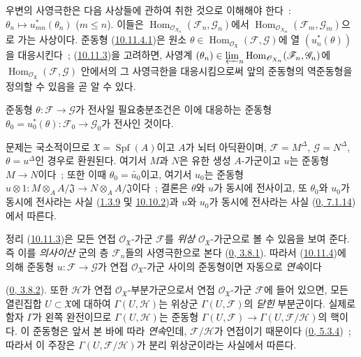우변의 사영극한은 다음 사상들에 관하여 취한 것으로 이해해야 한다~:
$\theta_n\mapsto u_{mn}^*(\theta_n)$ ($m\leq n$). 이들은
$\operatorname{Hom}_{\mathscr{O}_{X_n}}
(\mathscr{F}_n,\mathscr{G}_n)$에서
$\operatorname{Hom}_{\mathscr{O}_{X_m}}
(\mathscr{F}_m,\mathscr{G}_m)$으로 가는 사상이다. 준동형
(\hyperref[I.10.11.4.1-ko]{10.11.4.1})은 원소
$\theta\in\operatorname{Hom}_{\mathscr{O}_{\mathfrak{X}}}
(\mathscr{F},\mathscr{G})$에 열 $(u_n^*(\theta))$을 대응시킨다~;
(\hyperref[I.10.11.3-ko]{10.11.3})을 고려하면, 사영계
$(\theta_n)\in\varprojlim_n
\operatorname{Hom}_{\mathscr{O}_{X_n}}
(\mathscr{F}_n,\mathscr{G}_n)$에
$\operatorname{Hom}_{\mathscr{O}_{\mathfrak{X}}}
(\mathscr{F},\mathscr{G})$ 안에서의 그 사영극한을 대응시킴으로써
앞의 준동형의 역준동형을 정의할 수 있음을 곧 알 수 있다.

\begin{corollary}[10.11.5]
\label{I.10.11.5-ko}
준동형 $\theta:\mathscr{F}\to\mathscr{G}$가 전사일 필요충분조건은
이에 대응하는 준동형
$\theta_0=u_0^*(\theta):\mathscr{F}_0\to\mathscr{G}_0$가 전사인 것이다.
\end{corollary}

문제는 국소적이므로
$\mathfrak{X}=\operatorname{Spf}(A)$이고 $A$가 뇌터 아딕환이며,
$\mathscr{F}=M^\Delta$, $\mathscr{G}=N^\Delta$, $\theta=u^\Delta$인
경우로 환원된다. 여기서 $M$과 $N$은 유한 생성 $A$-가군이고
$u$는 준동형 $M\to N$이다~; 또한 이때
$\theta_0=\widetilde{u_0}$이고, 여기서 $u_0$는 준동형
$u\otimes1:M\otimes_A A/\mathfrak{J}\to
N\otimes_A A/\mathfrak{J}$이다~;
결론은 $\theta$와 $u$가 동시에 전사이고, 또 $\theta_0$와
$u_0$가 동시에 전사라는 사실
(\hyperref[I.1.3.9-ko]{1.3.9} 및
\hyperref[I.10.10.2-ko]{10.10.2})과 $u$와 $u_0$가 동시에 전사라는
사실 (\hyperref[0.7.1.14-ko]{0, 7.1.14})에서 따른다.

\begin{env}[10.11.6]
\label{I.10.11.6-ko}
정리 (\hyperref[I.10.11.3-ko]{10.11.3})은 모든 연접
$\mathscr{O}_{\mathfrak{X}}$-가군 $\mathscr{F}$를
\emph{위상} $\mathscr{O}_{\mathfrak{X}}$-가군으로 볼 수 있음을
보여 준다. 즉 이를 \emph{의사이산} 군의 층 $\mathscr{F}_n$들의
사영극한으로 본다
(\hyperref[0.3.8.1-ko]{0, 3.8.1}). 따라서
(\hyperref[I.10.11.4-ko]{10.11.4})에 의해 준동형
$u:\mathscr{F}\to\mathscr{G}$가 연접
$\mathscr{O}_{\mathfrak{X}}$-가군 사이의 준동형이면 자동으로
\emph{연속}이다


(\hyperref[0.3.8.2-ko]{0, 3.8.2}). 또한 $\mathscr{H}$가 연접
$\mathscr{O}_{\mathfrak{X}}$-부분가군으로서 연접
$\mathscr{O}_{\mathfrak{X}}$-가군 $\mathscr{F}$에 들어 있으면, 모든 열린집합
$U\subset\mathfrak{X}$에 대하여 $\Gamma(U,\mathscr{H})$는 위상군
$\Gamma(U,\mathscr{F})$의 \emph{닫힌} 부분군이다. 실제로 함자
$\Gamma$가 왼쪽 완전이므로 $\Gamma(U,\mathscr{H})$는 준동형
$\Gamma(U,\mathscr{F})\to\Gamma(U,\mathscr{F}/\mathscr{H})$의
핵이다. 이 준동형은 앞서 본 바에 따라 \emph{연속}인데,
$\mathscr{F}/\mathscr{H}$가 연접이기 때문이다
(\hyperref[0.5.3.4-ko]{0, 5.3.4})~; 따라서 이 주장은
$\Gamma(U,\mathscr{F}/\mathscr{H})$가 분리 위상군이라는 사실에서
따른다.
\end{env}

